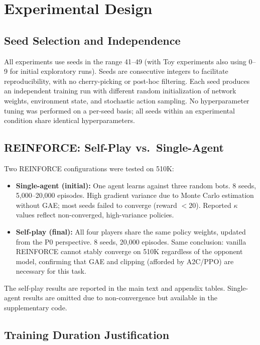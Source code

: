 \documentclass[letterpaper]{article}
\begin{document}
\section{Experimental Design}

\subsection{Seed Selection and Independence}

All experiments use seeds in the range 41--49 (with Toy experiments also using 0--9 for initial exploratory runs).
Seeds are consecutive integers to facilitate reproducibility, with no cherry-picking or post-hoc filtering.
Each seed produces an independent training run with different random initialization of network weights, environment state, and stochastic action sampling.
No hyperparameter tuning was performed on a per-seed basis; all seeds within an experimental condition share identical hyperparameters.

\subsection{REINFORCE: Self-Play vs.\ Single-Agent}

Two REINFORCE configurations were tested on 510K:

\begin{itemize}
\item \textbf{Single-agent (initial):} One agent learns against three random bots. 8 seeds, 5,000--20,000 episodes. High gradient variance due to Monte Carlo estimation without GAE; most seeds failed to converge (reward $< 20$). Reported $\kappa$ values reflect non-converged, high-variance policies.
\item \textbf{Self-play (final):} All four players share the same policy weights, updated from the P0 perspective. 8 seeds, 20,000 episodes. Same conclusion: vanilla REINFORCE cannot stably converge on 510K regardless of the opponent model, confirming that GAE and clipping (afforded by A2C/PPO) are necessary for this task.
\end{itemize}

The self-play results are reported in the main text and appendix tables. Single-agent results are omitted due to non-convergence but available in the supplementary code.

\subsection{Training Duration Justification}
\end{document}
